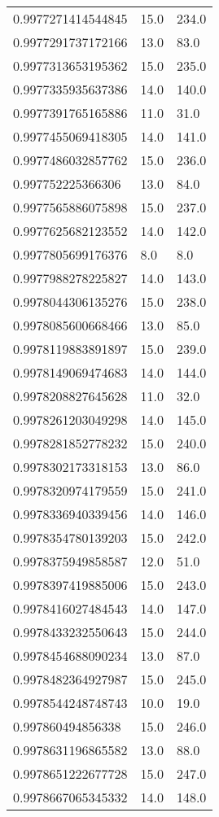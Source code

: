 \begin{center}
\begin{supertabular}[H]{p{0.30\textwidth}p{0.05\textwidth}p{0.05\textwidth}}
0.9977271414544845 & 15.0 & 234.0 \\ 
0.9977291737172166 & 13.0 & 83.0 \\ 
0.9977313653195362 & 15.0 & 235.0 \\ 
0.9977335935637386 & 14.0 & 140.0 \\ 
0.9977391765165886 & 11.0 & 31.0 \\ 
0.9977455069418305 & 14.0 & 141.0 \\ 
0.9977486032857762 & 15.0 & 236.0 \\ 
0.997752225366306 & 13.0 & 84.0 \\ 
0.9977565886075898 & 15.0 & 237.0 \\ 
0.9977625682123552 & 14.0 & 142.0 \\ 
0.9977805699176376 & 8.0 & 8.0 \\ 
0.9977988278225827 & 14.0 & 143.0 \\ 
0.9978044306135276 & 15.0 & 238.0 \\ 
0.9978085600668466 & 13.0 & 85.0 \\ 
0.9978119883891897 & 15.0 & 239.0 \\ 
0.9978149069474683 & 14.0 & 144.0 \\ 
0.9978208827645628 & 11.0 & 32.0 \\ 
0.9978261203049298 & 14.0 & 145.0 \\ 
0.9978281852778232 & 15.0 & 240.0 \\ 
0.9978302173318153 & 13.0 & 86.0 \\ 
0.9978320974179559 & 15.0 & 241.0 \\ 
0.9978336940339456 & 14.0 & 146.0 \\ 
0.9978354780139203 & 15.0 & 242.0 \\ 
0.9978375949858587 & 12.0 & 51.0 \\ 
0.9978397419885006 & 15.0 & 243.0 \\ 
0.9978416027484543 & 14.0 & 147.0 \\ 
0.9978433232550643 & 15.0 & 244.0 \\ 
0.9978454688090234 & 13.0 & 87.0 \\ 
0.9978482364927987 & 15.0 & 245.0 \\ 
0.9978544248748743 & 10.0 & 19.0 \\ 
0.997860494856338 & 15.0 & 246.0 \\ 
0.9978631196865582 & 13.0 & 88.0 \\ 
0.9978651222677728 & 15.0 & 247.0 \\ 
0.9978667065345332 & 14.0 & 148.0 \\ 

\end{supertabular}
\end{center}
